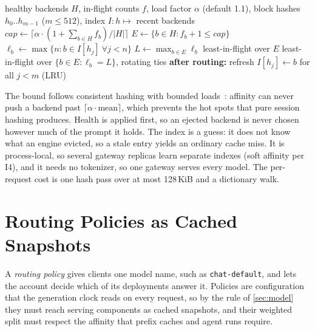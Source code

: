 \documentclass[conference,letterpaper]{IEEEtran}
\newcommand{\code}[1]{\texttt{\small #1}}
\begin{document}
\begin{algorithm}[t]
\caption{Prefix-aware backend selection (per request)}
\label{alg:prefix}
\small
\begin{algorithmic}[1]
\Require healthy backends $H$, in-flight counts $f$, load factor $\alpha$ (default 1.1),
block hashes $h_0..h_{m-1}$ ($m \le 512$), index $I: h \mapsto$ recent backends
\State $\mathit{cap} \gets \lceil \alpha \cdot (1+\sum_{b\in H} f_b)/|H| \rceil$
\State $E \gets \{ b \in H : f_b + 1 \le \mathit{cap} \}$ 
  \State $\ell_b \gets \max\{ n : b \in I[h_j]\ \forall j < n \}$ 
\EndFor
\State $L \gets \max_{b\in E} \ell_b$
 \State \Return least-in-flight over $E$ \EndIf
\State \Return least-in-flight over $\{b \in E : \ell_b = L\}$, rotating ties
\State \textbf{after routing:} refresh $I[h_j] \gets b$ for all $j<m$ (LRU)
\end{algorithmic}
\end{algorithm}

The bound follows consistent hashing with bounded loads~\cite{karger,boundedloads}: affinity
can never push a backend past $\lceil\alpha\cdot\text{mean}\rceil$, which prevents the hot
spots that pure session hashing produces. Health is applied first, so an ejected backend is
never chosen however much of the prompt it holds. The index is a guess: it does not know what
an engine evicted, so a stale entry yields an ordinary cache miss. It is process-local, so
several gateway replicas learn separate indexes (soft affinity per I4), and it needs no
tokenizer, so one gateway serves every model. The per-request cost is one hash pass over at
most 128\,KiB and a dictionary walk.

\section{Routing Policies as Cached Snapshots}
\label{sec:policies}

A \emph{routing policy} gives clients one model name, such as \code{chat-default}, and lets
the account decide which of its deployments answer it. Policies are configuration that the
generation clock reads on every request, so by the rule of \cref{sec:model} they must reach
serving components as cached snapshots, and their weighted split must respect the affinity
that prefix caches and agent runs require.
\end{document}
